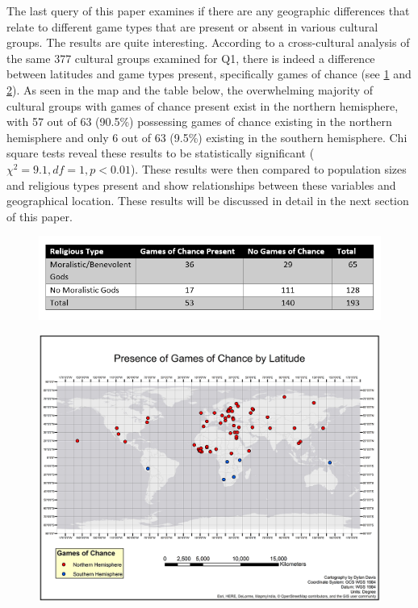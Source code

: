 \documentclass[%
	]{ijsra}
\begin{document}
The last query of this paper examines if there are any geographic differences that relate to different game types that are present or absent in various cultural groups. The results are quite interesting. According to a cross-cultural analysis of the same 377 cultural groups examined for Q1, there is indeed a difference between latitudes and game types present, specifically games of chance (see \cref{fig:Davis-Table03} and \cref{fig:Figure4_Davis_082016}). As seen in the map and the table below, the overwhelming majority of cultural groups with games of chance present exist in the northern hemisphere, with 57 out of 63 (90.5\%) possessing games of chance existing in the northern hemisphere and only 6 out of 63 (9.5\%) existing in the southern hemisphere. Chi square tests reveal these results to be statistically significant ($\chi^{2} = 9.1, df = 1, p < 0.01$). These results were then compared to population sizes and religious types present and show relationships between these variables and geographical location. These results will be discussed in detail in the next section of this paper.

\begin{figure}[!htb] %
	\includegraphics[width=\linewidth]{figures/Davis-Table02}
	\centering
	\label{fig:Davis-Table03}
\end{figure}

\begin{figure} [!htb] %
	\includegraphics[width=\linewidth]{figures/Figure4_Davis_082016}
	\caption
	\centering
	\label{fig:Figure4_Davis_082016}
\end{figure}
\end{document}
